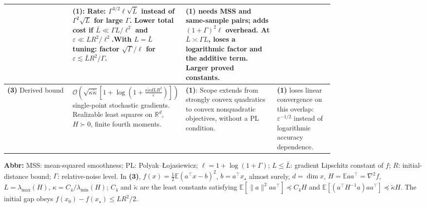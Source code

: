 \begin{table}[tp]
\begin{threeparttable}
\begin{tabularx}{\linewidth}{@{}>{\raggedright\arraybackslash}p{0.20\linewidth}>{\raggedright\arraybackslash}p{0.30\linewidth}>{\raggedright\arraybackslash}p{0.28\linewidth}>{\raggedright\arraybackslash}X@{}}
& \textbf{(1)}: Rate: $\Gamma^{3/2}\ell\sqrt{\bar L}$ instead of $\Gamma^2\sqrt L$ for large $\Gamma$. Lower total cost if $\bar L\ll\Gamma L/\ell^2$ and $\varepsilon\ll LR^2/\ell^2$.\newline With $L=\bar L$ tuning: factor $\sqrt\Gamma/\ell$ for $\varepsilon\lesssim\bar L R^2/\Gamma$.
& \textbf{(1)} needs MSS and same-sample pairs; adds $(1+\Gamma)^2\ell$ overhead. At $\bar L\asymp\Gamma L$, loses a logarithmic factor and the additive term. Larger proved constants.
\\
\midrule
\textbf{(3)} Derived bound \citep[Thm.~1]{sgmssJain2018}
& $\displaystyle\mathcal{O}\!\left(\sqrt{\kappa\widetilde\kappa}\left[1+\log\!\left(1+\frac{\kappa\widetilde\kappa dLR^2}{\varepsilon}\right)\right]\right)$ single-point stochastic gradients. Realizable least squares on $\mathbb R^d$, $H\succ0$, finite fourth moments.
& \textbf{(1)}: Scope extends from strongly convex quadratics to convex nonquadratic objectives, without a PL condition.
& \textbf{(1)} loses linear convergence on this overlap: $\varepsilon^{-1/2}$ instead of logarithmic accuracy dependence.
\\
\bottomrule
\end{tabularx}
\begin{tablenotes}[flushleft]\footnotesize
\item[] \textbf{Abbr:} MSS: mean-squared smoothness; PL: Polyak--\L{}ojasiewicz; $\ell=1+\log(1+\Gamma)$; $L\le\bar L$: gradient Lipschitz constant of $f$; $R$: initial-distance bound; $\Gamma$: relative-noise level. In \textbf{(3)}, $f(x)=\tfrac12\mathbb E(a^\top x-b)^2$, $b=a^\top x_\star$ almost surely, $d=\dim x$, $H=\mathbb E aa^\top=\nabla^2 f$, $L=\lambda_{\max}(H)$, $\kappa=C_4/\lambda_{\min}(H)$; $C_4$ and $\widetilde\kappa$ are the least constants satisfying $\mathbb E[\|a\|^2aa^\top]\preceq C_4H$ and $\mathbb E[(a^\top H^{-1}a)aa^\top]\preceq\widetilde\kappa H$. The initial gap obeys $f(x_0)-f(x_\star)\le LR^2/2$.
\end{tablenotes}
\end{threeparttable}
\end{table}
\clearpage
